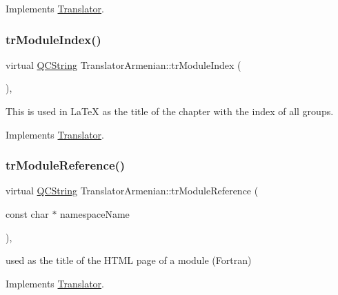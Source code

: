 Implements \mbox{\hyperlink{class_translator}{Translator}}.

\mbox{\label{class_translator_armenian_a639b6569977eefdcdf56d0c8655e22b7}} 
\subsubsection{\texorpdfstring{trModuleIndex()}{trModuleIndex()}}
{\footnotesize\ttfamily virtual \mbox{\hyperlink{class_q_c_string}{Q\+C\+String}} Translator\+Armenian\+::tr\+Module\+Index (\begin{DoxyParamCaption}{ }\end{DoxyParamCaption})\hspace{0.3cm}{\ttfamily [inline]}, {\ttfamily [virtual]}}

This is used in La\+TeX as the title of the chapter with the index of all groups. 

Implements \mbox{\hyperlink{class_translator}{Translator}}.

\mbox{\label{class_translator_armenian_a588c767ec0af3de52b52e4d68afea30e}} 
\subsubsection{\texorpdfstring{trModuleReference()}{trModuleReference()}}
{\footnotesize\ttfamily virtual \mbox{\hyperlink{class_q_c_string}{Q\+C\+String}} Translator\+Armenian\+::tr\+Module\+Reference (\begin{DoxyParamCaption}\item[{const char $\ast$}]{namespace\+Name }\end{DoxyParamCaption})\hspace{0.3cm}{\ttfamily [inline]}, {\ttfamily [virtual]}}

used as the title of the H\+T\+ML page of a module (Fortran) 

Implements \mbox{\hyperlink{class_translator}{Translator}}.

\mbox{\label{class_translator_armenian_a78958dad9f6ae710955a910c1093414f}} 
